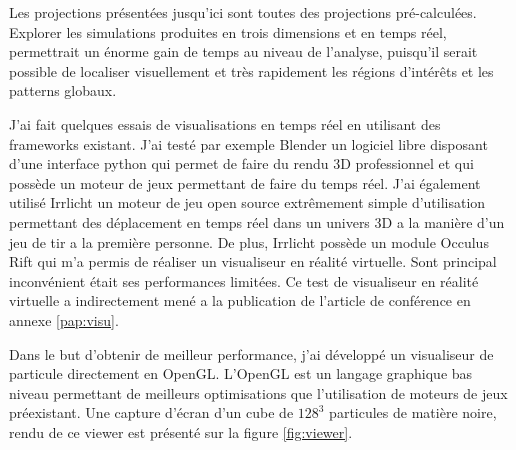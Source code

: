 Les projections présentées jusqu'ici sont toutes des projections pré-calculées.
Explorer les simulations produites en trois dimensions et en temps réel, permettrait un énorme gain de temps au niveau de l'analyse, puisqu'il serait possible de localiser visuellement et très rapidement les régions d’intérêts et les patterns globaux.

J'ai fait quelques essais de visualisations en temps réel en utilisant des frameworks existant.
J'ai testé par exemple Blender %
un logiciel libre disposant d'une interface python qui permet de faire du rendu 3D professionnel et qui possède un moteur de jeux permettant de faire du temps réel.
J'ai également utilisé Irrlicht %
un moteur de jeu open source extrêmement simple d'utilisation permettant des déplacement en temps réel dans un univers 3D a la manière d'un jeu de tir a la première personne.
De plus, Irrlicht possède un module Occulus Rift qui m'a permis de réaliser un visualiseur en réalité virtuelle.
Sont principal inconvénient était ses performances limitées.
Ce test de visualiseur en réalité virtuelle a indirectement mené a la publication de l'article de conférence en annexe \ref{pap:visu}.



%
%
%


Dans le but d'obtenir de meilleur performance, j'ai développé un visualiseur de particule directement en OpenGL.
L'OpenGL est un langage graphique bas niveau permettant de meilleurs optimisations que l'utilisation de moteurs de jeux préexistant.
Une capture d'écran d'un cube de $128^3$ particules de matière noire, rendu de ce viewer est présenté sur la figure \ref{fig:viewer}.


